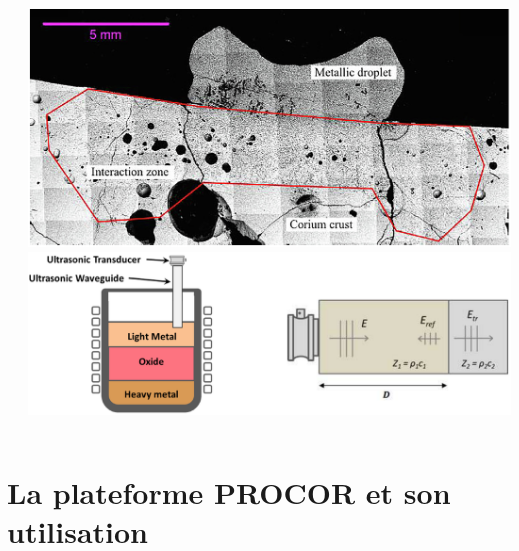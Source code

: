 \begin{frame}[fragile]
\begin{itemize}
\begin{columns}
\begin{column}{0.1\textwidth}
	\end{column}
	\begin{column}{0.35\textwidth}
	\includegraphics[width=\textwidth]{Figures/cormet.png} \\
	\includegraphics[width=\textwidth]{Figures/stromboli.png}
	\end{column}
	\end{columns}
	\end{itemize}
\end{frame}

\section{La plateforme PROCOR et son utilisation}
